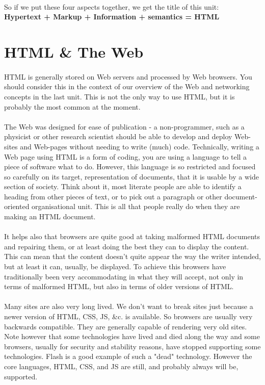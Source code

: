 \paragraph{} So if we put these four aspects together, we get the title of this unit:\\
{\bf{Hypertext + Markup + Information + semantics = HTML}}

\section{HTML \& The Web}
\paragraph{} HTML is generally stored on Web servers and processed by Web browsers. You should consider this in the context of our overview of the Web and networking concepts in the last unit. This is not the only way to use HTML, but it is probably the most common at the moment.
\paragraph{} The Web was designed for ease of publication - a non-programmer, such as a physicist or other research scientist should be able to develop and deploy Web-sites and Web-pages without needing to write (much) code. Technically, writing a Web page using HTML is a form of coding, you are using a language to tell a piece of software what to do. However, this language is so restricted and focused so carefully on its target, representation of documents, that it is usable by a wide section of society. Think about it, most literate people are able to identify a heading from other pieces of text, or to pick out a paragraph or other document-oriented organisational unit. This is all that people really do when they are making an HTML document.
\paragraph{} It helps also that browsers are quite good at taking malformed HTML documents and repairing them, or at least doing the best they can to display the content. This can mean that the content doesn't quite appear the way the writer intended, but at least it can, usually, be displayed. To achieve this browsers have traditionally been very accommodating in what they will accept, not only in terms of malformed HTML, but also in terms of older versions of HTML.
\paragraph{} Many sites are also very long lived. We don’t want to break sites just because a newer version of HTML, CSS, JS, \&c. is available. So browsers are usually very backwards compatible. They are  generally capable of rendering very old sites. Note however that some technologies have lived and died along the way and some browsers, usually for security and stability reasons, have stopped supporting some technologies. Flash is a good example of such a "dead" technology. However the core languages, HTML, CSS, and JS are still, and probably always will be, supported.
